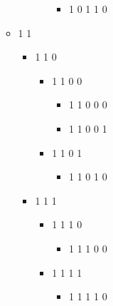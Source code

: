 \begin{itemize}
\begin{itemize}
\begin{itemize}
\begin{itemize}
\begin{itemize}
\item 1 0 1 1 0
\end{itemize}
\end{itemize}
\end{itemize}
\item 1 1 


\begin{itemize}
\item 1 1 0 


\begin{itemize}
\item 1 1 0 0 


\begin{itemize}
\item 1 1 0 0 0 
\item 1 1 0 0 1
\end{itemize}
\item 1 1 0 1 


\begin{itemize}
\item 1 1 0 1 0
\end{itemize}
\end{itemize}
\item 1 1 1 


\begin{itemize}
\item 1 1 1 0 


\begin{itemize}
\item 1 1 1 0 0
\end{itemize}
\item 1 1 1 1 


\begin{itemize}
\item 1 1 1 1 0
\end{itemize}
\end{itemize}
\end{itemize}
\end{itemize}
\end{itemize}

